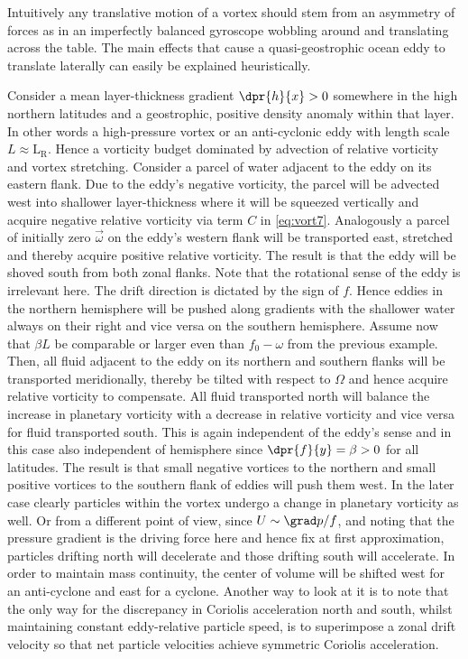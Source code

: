 Intuitively any translative motion of a vortex should stem from an asymmetry of forces as in an imperfectly balanced gyroscope wobbling around and translating across the table. The main effects that cause a quasi-geostrophic ocean eddy to translate laterally can easily be explained heuristically.
\begin{description}
Consider a mean layer-thickness gradient $\dpr{h}{x}>0$ somewhere in the high northern latitudes and a geostrophic, positive density anomaly within that layer.
In other words a high-pressure vortex or an anti-cyclonic eddy with length scale $L\approx \mathrm{L_{R}}$. Hence a vorticity budget dominated by advection of
relative vorticity and vortex stretching. Consider a parcel of water adjacent to the eddy on its eastern flank. Due to the eddy's negative vorticity, the parcel
will be advected west into shallower layer-thickness where it will be squeezed vertically and acquire negative relative vorticity via term $C$ in \eqref{eq:vort7}.
Analogously a parcel of initially zero $\vec{\omega}$ on the eddy's western flank will be transported east, stretched and thereby acquire positive relative
vorticity. The result is that the eddy will be shoved south from both zonal flanks. Note that the rotational sense of the eddy is irrelevant here. The drift
direction is dictated by the sign of $f$. Hence eddies in the
northern hemisphere will be pushed along gradients with the shallower water always on their right and vice versa on the southern hemisphere.
Assume now that $\beta L$ be comparable or larger even than $f_{0}-\omega$ from the previous example. Then, all fluid adjacent to the eddy on its northern and southern flanks will be transported meridionally, thereby be tilted with respect to $\Omega$ and hence acquire relative vorticity to compensate. All fluid transported north will balance the increase in planetary vorticity with a decrease in relative vorticity and vice versa for fluid transported south. This is again independent of the eddy's sense and in this case also independent of hemisphere since $\dpr{f}{y}=\beta>0$ for all latitudes. The result is that small negative vortices to the northern and small positive vortices to the southern flank of eddies will push them west.
In the later case clearly particles within the vortex undergo a change in planetary vorticity as well. Or from a different point of view, since $U \sim \grad p/f  $, and noting that the pressure gradient is the driving force here and hence fix at first approximation, particles drifting north will decelerate and those drifting south will accelerate. In order to maintain mass continuity, the center of volume will be shifted west for an anti-cyclone and east for a cyclone. Another way to look at it is to note that the only way for the discrepancy in Coriolis acceleration north and south, whilst maintaining constant eddy-relative particle speed, is to superimpose a zonal drift velocity so that net particle velocities achieve symmetric Coriolis acceleration.
\end{description}

\newpage
